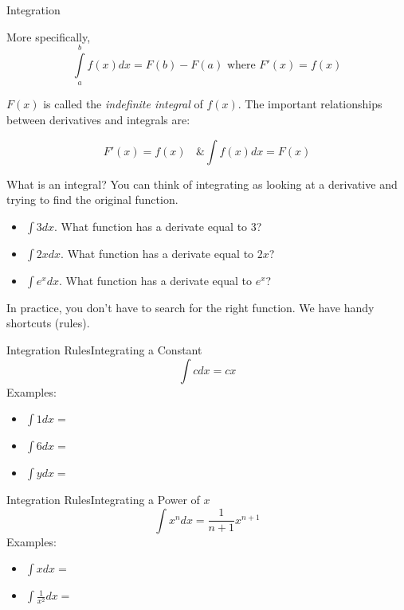 \documentclass{beamer}
\begin{document}
\begin{frame}{Integration}

More specifically,
\[
\int\limits_a^bf(x)dx=F(b)-F(a) \textrm{ where } F'(x)=f(x)
\]

$F(x)$ is called the \textit{indefinite integral} of $f(x)$. The important relationships between derivatives and integrals are:

\[
F'(x)=f(x) \;\;\textrm{        \&      } \int f(x)dx=F(x)
\]

\end{frame}

\begin{frame}{What is an integral?}
You can think of integrating as looking at a derivative and trying to find the original function.
\vspace{3mm}

\begin{itemize}
\item $\int 3 dx$.
What function has a derivate equal to 3? %
\item $\int 2x dx$. %
What function has a derivate equal to $2x$? %
\item $\int e^x dx$. %
What function has a derivate equal to $e^x$? %
\end{itemize}
\vspace{2mm}
In practice, you don't have to search for the right function. We have handy shortcuts (rules).

\end{frame}

\begin{frame}{Integration Rules}{Integrating a Constant}
\[
\int c dx=cx
\]
Examples:
\begin{itemize}
\item $\int 1dx=$%
\vspace{2mm}
\item $\int 6dx=$%
\vspace{2mm}
\item $\int ydx=$%
\end{itemize}
\end{frame}


\begin{frame}{Integration Rules}{Integrating a Power of $x$}
\[
\int x^n dx=\frac{1}{n+1}x^{n+1}
\] %
Examples:
\begin{itemize}
\item $\int xdx=$%
\vspace{2mm}
\item $\int \frac{1}{x^2}dx=$%
\end{itemize}
\end{frame}
\end{document}
